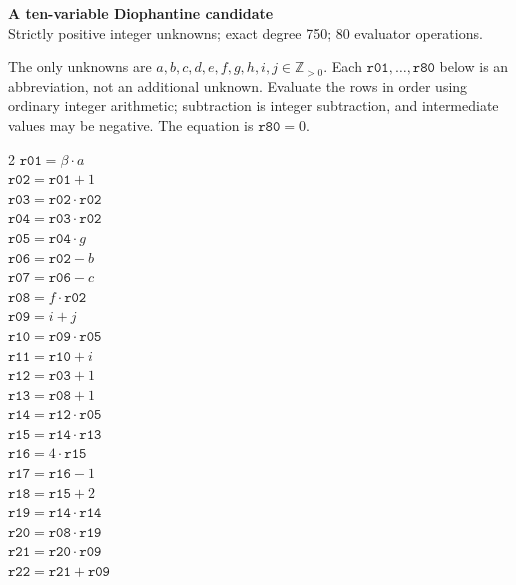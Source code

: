 \documentclass[10pt]{article}
\begin{document}
\begin{center}
{\large\bfseries A ten-variable Diophantine candidate}\\
{\small Strictly positive integer unknowns; exact degree 750; 80 evaluator operations.}
\end{center}
The only unknowns are \(a,b,c,d,e,f,g,h,i,j\in\mathbb Z_{>0}\).
Each \(\mathtt{r01},\ldots,\mathtt{r80}\) below is an abbreviation,
not an additional unknown. Evaluate the rows in order using ordinary integer
arithmetic; subtraction is integer subtraction, and intermediate values may be
negative. The equation is
\(\boxed{\mathtt{r80}=0}\).

\begin{multicols}{2}\small
\(\mathtt{r01} = \beta \cdot a\)\\
\(\mathtt{r02} = \mathtt{r01} + 1\)\\
\(\mathtt{r03} = \mathtt{r02} \cdot \mathtt{r02}\)\\
\(\mathtt{r04} = \mathtt{r03} \cdot \mathtt{r02}\)\\
\(\mathtt{r05} = \mathtt{r04} \cdot g\)\\
\(\mathtt{r06} = \mathtt{r02} - b\)\\
\(\mathtt{r07} = \mathtt{r06} - c\)\\
\(\mathtt{r08} = f \cdot \mathtt{r02}\)\\
\(\mathtt{r09} = i + j\)\\
\(\mathtt{r10} = \mathtt{r09} \cdot \mathtt{r05}\)\\
\(\mathtt{r11} = \mathtt{r10} + i\)\\
\(\mathtt{r12} = \mathtt{r03} + 1\)\\
\(\mathtt{r13} = \mathtt{r08} + 1\)\\
\(\mathtt{r14} = \mathtt{r12} \cdot \mathtt{r05}\)\\
\(\mathtt{r15} = \mathtt{r14} \cdot \mathtt{r13}\)\\
\(\mathtt{r16} = 4 \cdot \mathtt{r15}\)\\
\(\mathtt{r17} = \mathtt{r16} - 1\)\\
\(\mathtt{r18} = \mathtt{r15} + 2\)\\
\(\mathtt{r19} = \mathtt{r14} \cdot \mathtt{r14}\)\\
\(\mathtt{r20} = \mathtt{r08} \cdot \mathtt{r19}\)\\
\(\mathtt{r21} = \mathtt{r20} \cdot \mathtt{r09}\)\\
\(\mathtt{r22} = \mathtt{r21} + \mathtt{r09}\)\\

\end{multicols}
\end{document}
